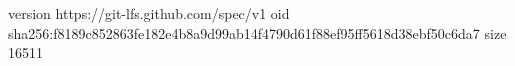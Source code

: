 version https://git-lfs.github.com/spec/v1
oid sha256:f8189c852863fe182e4b8a9d99ab14f4790d61f88ef95ff5618d38ebf50c6da7
size 16511
